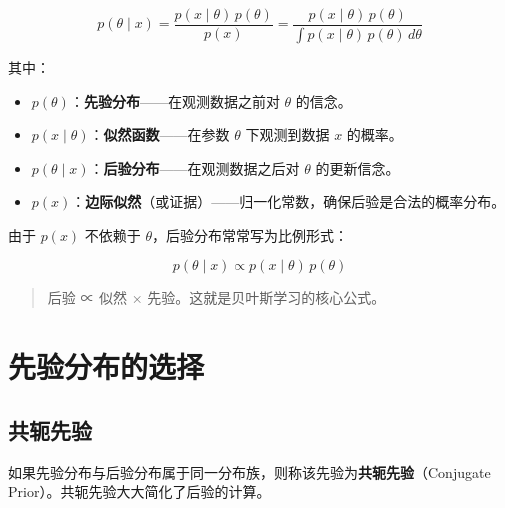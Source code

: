 \documentclass[
]{book}
\providecommand{\tightlist}{%
  \setlength{\itemsep}{0pt}\setlength{\parskip}{0pt}}
\begin{document}
\[p(\theta \mid x) = \frac{p(x \mid \theta) \, p(\theta)}{p(x)} = \frac{p(x \mid \theta) \, p(\theta)}{\int p(x \mid \theta) \, p(\theta) \, d\theta}\]

其中：

\begin{itemize}
\tightlist
\item
  \(p(\theta)\)：\textbf{先验分布}------在观测数据之前对 \(\theta\) 的信念。
\item
  \(p(x \mid \theta)\)：\textbf{似然函数}------在参数 \(\theta\) 下观测到数据 \(x\) 的概率。
\item
  \(p(\theta \mid x)\)：\textbf{后验分布}------在观测数据之后对 \(\theta\) 的更新信念。
\item
  \(p(x)\)：\textbf{边际似然}（或证据）------归一化常数，确保后验是合法的概率分布。
\end{itemize}

由于 \(p(x)\) 不依赖于 \(\theta\)，后验分布常常写为比例形式：

\[p(\theta \mid x) \propto p(x \mid \theta) \, p(\theta)\]

\begin{quote}
后验 ∝ 似然 × 先验。这就是贝叶斯学习的核心公式。
\end{quote}

\section{先验分布的选择}\label{ux5148ux9a8cux5206ux5e03ux7684ux9009ux62e9}

\subsection{共轭先验}\label{ux5171ux8f6dux5148ux9a8c}

如果先验分布与后验分布属于同一分布族，则称该先验为\textbf{共轭先验}（Conjugate Prior）。共轭先验大大简化了后验的计算。
\end{document}
